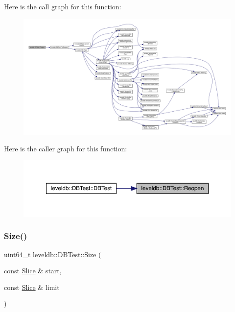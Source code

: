 Here is the call graph for this function\+:
\nopagebreak
\begin{figure}[H]
\begin{center}
\leavevmode
\includegraphics[width=350pt]{classleveldb_1_1_d_b_test_a09189633fd9c14d487685c3c400b5ccc_cgraph}
\end{center}
\end{figure}
Here is the caller graph for this function\+:
\nopagebreak
\begin{figure}[H]
\begin{center}
\leavevmode
\includegraphics[width=350pt]{classleveldb_1_1_d_b_test_a09189633fd9c14d487685c3c400b5ccc_icgraph}
\end{center}
\end{figure}
\mbox{\label{classleveldb_1_1_d_b_test_a2b16106ccbd302127b5c0575e74e6be1}} 
\subsubsection{\texorpdfstring{Size()}{Size()}}
{\footnotesize\ttfamily uint64\+\_\+t leveldb\+::\+D\+B\+Test\+::\+Size (\begin{DoxyParamCaption}\item[{const \mbox{\hyperlink{classleveldb_1_1_slice}{Slice}} \&}]{start,  }\item[{const \mbox{\hyperlink{classleveldb_1_1_slice}{Slice}} \&}]{limit }\end{DoxyParamCaption})\hspace{0.3cm}{\ttfamily [inline]}}

